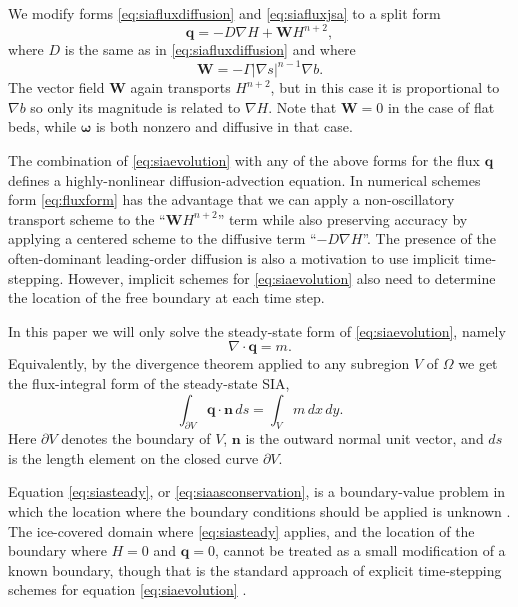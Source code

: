 \documentclass[twocolumn,letterpaper]{igs}
\newcommand\bn{\mathbf{n}}
\newcommand\bq{\mathbf{q}}
\newcommand\bW{\mathbf{W}}
\newcommand{\Div}{\nabla\cdot}
\newcommand{\grad}{\nabla}
\begin{document}
We modify forms \eqref{eq:siafluxdiffusion} and \eqref{eq:siafluxjsa} to a split form
\begin{equation}
\bq = - D \grad H + \bW H^{n+2},\label{eq:fluxform}
\end{equation}
where $D$ is the same as in \eqref{eq:siafluxdiffusion} and where
\begin{equation}
\bW = - \Gamma |\grad s|^{n-1} \grad b.  \label{eq:siaWdefine}
\end{equation}
The vector field $\bW$ again transports $H^{n+2}$, but in this case it is proportional to $\grad b$ so only its magnitude is related to $\grad H$.  Note that $\bW=0$ in the case of flat beds, while $\boldsymbol{\omega}$ is both nonzero and diffusive in that case.

The combination of \eqref{eq:siaevolution} with any of the above forms for the flux $\bq$ defines a highly-nonlinear diffusion-advection equation.  In numerical schemes form \eqref{eq:fluxform} has the advantage that we can apply a non-oscillatory transport scheme to the ``$\bW H^{n+2}$'' term while also preserving accuracy by applying a centered scheme to the diffusive term ``$-D \grad H$''.  The presence of the often-dominant leading-order diffusion is also a motivation to use implicit time-stepping.  However, implicit schemes for \eqref{eq:siaevolution} also need to determine the location of the free boundary at each time step.

In this paper we will only solve the steady-state form of \eqref{eq:siaevolution}, namely
\begin{equation}
\Div \bq = m.  \label{eq:siasteady}
\end{equation}
Equivalently, by the divergence theorem applied to any subregion $V$ of $\Omega$ we get the flux-integral form of the steady-state SIA,
\begin{equation}
  \int_{\partial V} \bq \cdot \bn\,ds = \int_V m\, dx\,dy. \label{eq:siaasconservation}
\end{equation}
Here $\partial V$ denotes the boundary of $V$, $\bn$ is the outward normal unit vector, and $ds$ is the length element on the closed curve $\partial V$.

Equation \eqref{eq:siasteady}, or \eqref{eq:siaasconservation}, is a boundary-value problem in which the location where the boundary conditions should be applied is unknown \citep{JaroschSchoofAnslow2013,JouvetBueler2012}.  The ice-covered domain where \eqref{eq:siasteady} applies, and the location of the boundary where $H=0$ and $\bq=0$, cannot be treated as a small modification of a known boundary, though that is the standard approach of explicit time-stepping schemes for equation \eqref{eq:siaevolution} \citep{Bueleretal2005,Huybrechtsetal1996}.
\end{document}
